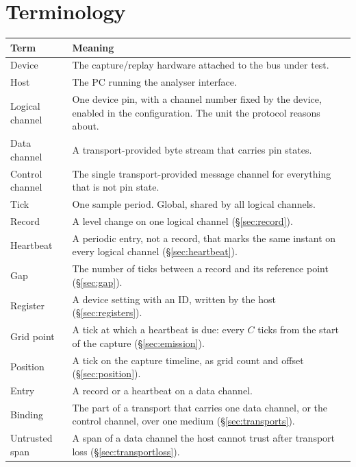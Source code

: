 \documentclass[11pt,a4paper]{article}
\newcommand{\sref}[1]{\S\ref{#1}}
\begin{document}
\section{Terminology}\label{sec:terms}

\begin{tabularx}{\linewidth}{@{}l L@{}}
\toprule
\textbf{Term} & \textbf{Meaning} \\
\midrule
Device & The capture/replay hardware attached to the bus under test. \\
Host & The PC running the analyser interface. \\
Logical channel & One device pin, with a channel number fixed by the device, enabled in the configuration. The unit the protocol reasons about. \\
Data channel & A transport-provided byte stream that carries pin states. \\
Control channel & The single transport-provided message channel for everything that is not pin state. \\
Tick & One sample period. Global, shared by all logical channels. \\
Record & A level change on one logical channel (\sref{sec:record}). \\
Heartbeat & A periodic entry, not a record, that marks the same instant on every logical channel (\sref{sec:heartbeat}). \\
Gap & The number of ticks between a record and its reference point (\sref{sec:gap}). \\
Register & A device setting with an ID, written by the host (\sref{sec:registers}). \\
Grid point & A tick at which a heartbeat is due: every $C$ ticks from the start of the capture (\sref{sec:emission}). \\
Position & A tick on the capture timeline, as grid count and offset (\sref{sec:position}). \\
Entry & A record or a heartbeat on a data channel. \\
Binding & The part of a transport that carries one data channel, or the control channel, over one medium (\sref{sec:transports}). \\
Untrusted span & A span of a data channel the host cannot trust after transport loss (\sref{sec:transportloss}). \\
\bottomrule
\end{tabularx}

\medskip
\end{document}
